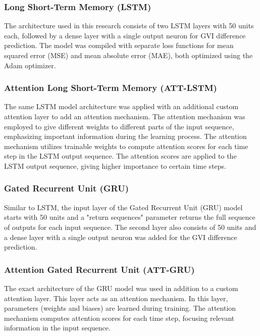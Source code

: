 

\subsubsection{Long Short-Term Memory (LSTM)}
The architecture used in this research consists of two LSTM layers with 50 units each, followed by a dense layer with a single output neuron for GVI difference prediction. The model was compiled with separate loss functions for mean squared error (MSE) and mean absolute error (MAE), both optimized using the Adam optimizer. 
\subsubsection{Attention Long Short-Term Memory (ATT-LSTM)}
The same LSTM model architecture was applied with an additional custom attention layer to add an attention mechanism. The attention mechanism was employed to give different weights to different parts of the input sequence, emphasizing important information during the learning process. The attention mechanism utilizes trainable weights to compute attention scores for each time step in the LSTM output sequence. The attention scores are applied to the LSTM output sequence, giving higher importance to certain time steps. %
\subsubsection{Gated Recurrent Unit (GRU)}
Similar to LSTM, the input layer of the Gated Recurrent Unit (GRU) model starts with 50 units and a "return sequences" parameter returns the full sequence of outputs for each input sequence. The second layer also consists of 50 units and a dense layer with a single output neuron was added for the GVI difference prediction.

\subsubsection{Attention Gated Recurrent Unit (ATT-GRU)}
The exact architecture of the GRU model was used in addition to a custom attention layer. This layer acts as an attention mechanism. In this layer, parameters (weights and biases) are learned during training. The attention mechanism computes attention scores for each time step, focusing relevant information in the input sequence.

